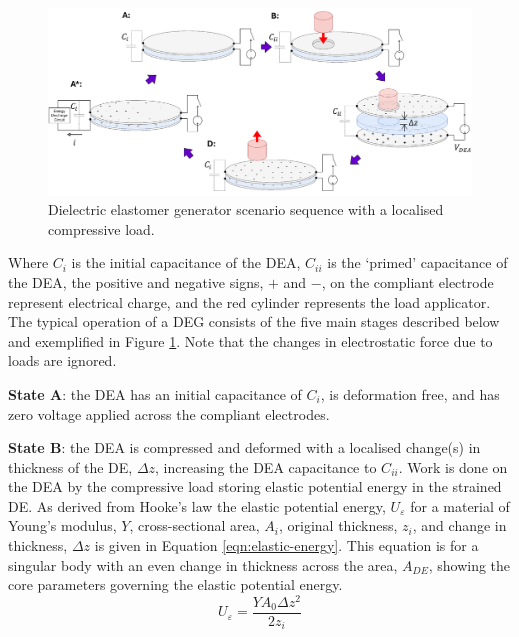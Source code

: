 \begin{figure}[H]
	\centering
	\includegraphics[width = \textwidth]{Figures/DEA-EIT-DEG_sequence_v2.png}
	\vspace{0.2cm}
	\caption{Dielectric elastomer generator scenario sequence with a localised compressive load.}
	\label{fig:dea_eit_deg}
\end{figure}
Where $C_i$ is the initial capacitance of the DEA, $C_{ii}$ is the `primed' capacitance of the DEA, the positive and negative signs, $+$ and $-$, on the compliant electrode represent electrical charge, and the red cylinder represents the load applicator. The typical operation of a DEG consists of the five main stages described below and exemplified in Figure \ref{fig:dea_eit_deg}. Note that the changes in electrostatic force due to loads are ignored.

\textbf{State A}: the DEA has an initial capacitance of $C_i$, is deformation free, and has zero voltage applied across the compliant electrodes.

\textbf{State B}: the DEA is compressed and deformed with a localised change(s) in thickness of the DE, $\Delta z$, increasing the DEA capacitance to $C_{ii}$. Work is done on the DEA by the compressive load storing elastic potential energy in the strained DE.
As derived from Hooke's law the elastic potential energy, $U_{\varepsilon}$ for a material of Young's modulus, $Y$, cross-sectional area, $A_i$, original thickness, $z_i$, and change in thickness, $\Delta z$ is given in Equation \ref{eqn:elastic-energy}. This equation is for a singular body with an even change in thickness across the area, $A_{DE}$, showing the core parameters governing the elastic potential energy.
\begin{equation}
	U_{\varepsilon} = \frac{YA_0\Delta z^2}{2z_i}
	\label{eqn:elastic-energy}
\end{equation}

